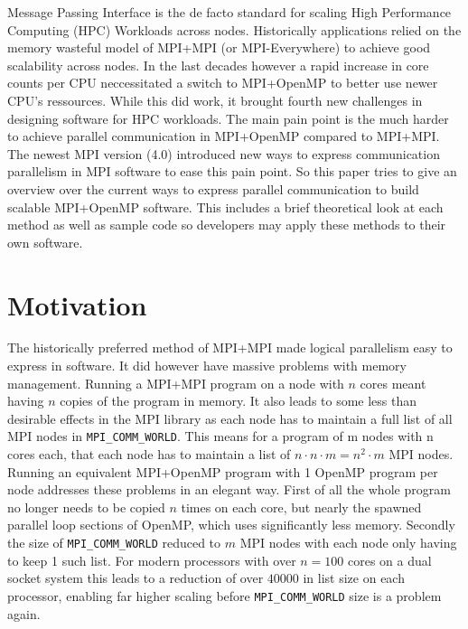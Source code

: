 \documentclass[sigconf]{acmart} %
\begin{document}
Message Passing Interface is the de facto standard for scaling High Performance Computing (HPC) Workloads across nodes.
Historically applications relied on the memory wasteful model of MPI+MPI (or MPI-Everywhere) to achieve good scalability across nodes.
In the last decades however a rapid increase in core counts per CPU neccessitated a switch to MPI+OpenMP to better use newer CPU's ressources.
While this did work, it brought fourth new challenges in designing software for HPC workloads.
The main pain point is the much harder to achieve parallel communication in MPI+OpenMP compared to MPI+MPI.
The newest MPI version (4.0) introduced new ways to express communication parallelism in MPI software to ease this pain point.
So this paper tries to give an overview over the current ways to express parallel communication to build scalable MPI+OpenMP software.
This includes a brief theoretical look at each method as well as sample code so developers may apply these methods to their own software.



\section{Motivation}
The historically preferred method of MPI+MPI made logical parallelism easy to express in software.
It did however have massive problems with memory management.
Running a MPI+MPI program on a node with $n$ cores meant having $n$ copies of the program in memory.
It also leads to some less than desirable effects in the MPI library as each node has to maintain a full list of all MPI nodes in \verb|MPI_COMM_WORLD|.
This means for a program of m nodes with n cores each, that each node has to maintain a list of $n \cdot n \cdot m = n^2 \cdot m$ MPI nodes.
Running an equivalent MPI+OpenMP program with 1 OpenMP program per node addresses these problems in an elegant way.
First of all the whole program no longer needs to be copied $n$ times on each core, but nearly the spawned parallel loop sections of OpenMP, which uses significantly less memory.
Secondly the size of \verb|MPI_COMM_WORLD| reduced to $m$ MPI nodes with each node only having to keep 1 such list.
For modern processors with over $n=100$ cores on a dual socket system this leads to a reduction of over $40000$ in list size on each processor, enabling far higher scaling before \verb|MPI_COMM_WORLD| size is a problem again.
\end{document}
